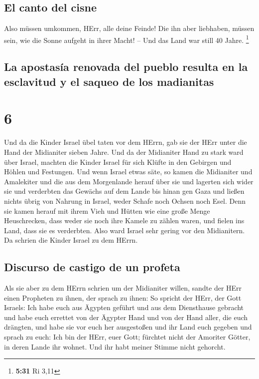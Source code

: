 \hypertarget{el-canto-del-cisne}{%
\subsection{El canto del cisne}\label{el-canto-del-cisne}}

 Also müssen umkommen, HErr, alle deine Feinde! Die ihn
aber liebhaben, müssen sein, wie die Sonne aufgeht in ihrer Macht! --
Und das Land war still 40 Jahre. \footnote{\textbf{5:31} Ri 3,11}

\hypertarget{la-apostasuxeda-renovada-del-pueblo-resulta-en-la-esclavitud-y-el-saqueo-de-los-madianitas}{%
\subsection{La apostasía renovada del pueblo resulta en la esclavitud y
el saqueo de los
madianitas}\label{la-apostasuxeda-renovada-del-pueblo-resulta-en-la-esclavitud-y-el-saqueo-de-los-madianitas}}

\hypertarget{section-5}{%
\section{6}\label{section-5}}

 Und da die Kinder Israel übel taten vor dem HErrn, gab
sie der HErr unter die Hand der Midianiter sieben Jahre. 
Und da der Midianiter Hand zu stark ward über Israel, machten die Kinder
Israel für sich Klüfte in den Gebirgen und Höhlen und Festungen.
 Und wenn Israel etwas säte, so kamen die Midianiter und
Amalekiter und die aus dem Morgenlande herauf über sie 
und lagerten sich wider sie und verderbten das Gewächs auf dem Lande bis
hinan gen Gaza und ließen nichts übrig von Nahrung in Israel, weder
Schafe noch Ochsen noch Esel.  Denn sie kamen herauf mit
ihrem Vieh und Hütten wie eine große Menge Heuschrecken, dass weder sie
noch ihre Kamele zu zählen waren, und fielen ins Land, dass sie es
verderbten.  Also ward Israel sehr gering vor den
Midianitern. Da schrien die Kinder Israel zu dem HErrn.

\hypertarget{discurso-de-castigo-de-un-profeta}{%
\subsection{Discurso de castigo de un
profeta}\label{discurso-de-castigo-de-un-profeta}}

 Als sie aber zu dem HErrn schrien um der Midianiter
willen,  sandte der HErr einen Propheten zu ihnen, der
sprach zu ihnen: So spricht der HErr, der Gott Israels: Ich habe euch
aus Ägypten geführt und aus dem Diensthause gebracht  und
habe euch errettet von der Ägypter Hand und von der Hand aller, die euch
drängten, und habe sie vor euch her ausgestoßen und ihr Land euch
gegeben  und sprach zu euch: Ich bin der HErr, euer Gott;
fürchtet nicht der Amoriter Götter, in deren Lande ihr wohnet. Und ihr
habt meiner Stimme nicht gehorcht.

